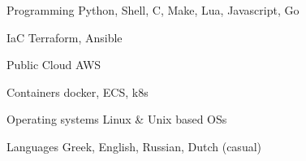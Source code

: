 


\begin{cvskills}


\cvskill
{Programming} %
{Python, Shell, C, Make, Lua, Javascript, Go} %


\cvskill
{IaC} %
{Terraform, Ansible} %


\cvskill
{Public Cloud} %
{AWS} %


\cvskill
{Containers} %
{docker, ECS, k8s} %




\cvskill
{Operating systems} %
{Linux \& Unix based OSs} %




\cvskill
{Languages} %
{Greek, English, Russian, Dutch (casual)} %

\end{cvskills}
